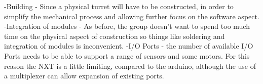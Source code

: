 -Building - Since a physical turret will have to be constructed, in order to simplify the mechanical process and allowing further focus on the software aspect.
-Integration of modules - As before, the group doesn't want to spend too much time on the physical aspect of construction so things like soldering and integration of modules
is inconvenient.
-I/O Ports - the number of available I/O Ports needs to be able to support a range of sensors and some motors. For this reason the NXT is a little limiting,
compared to the arduino, although the use of a multiplexer can allow expansion of existing ports.
